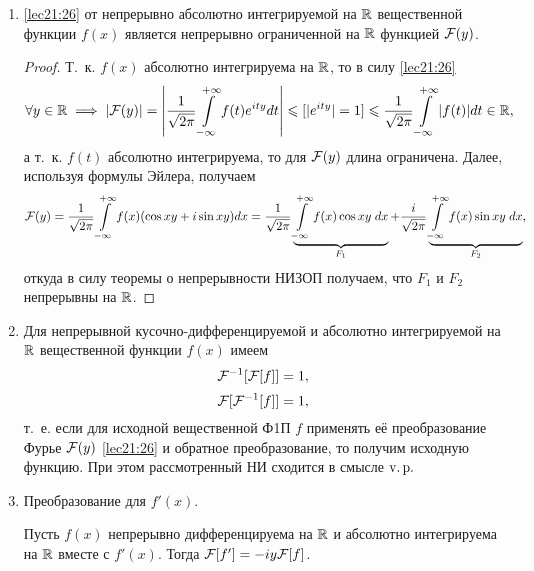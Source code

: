 \documentclass[../../main.tex]{subfiles}
\begin{document}
\begin{enumerate}
  \item \eqref{lec21:26} от непрерывно абсолютно интегрируемой на $\mathbb{R}$ 
  вещественной функции $f(x)$ является непрерывно ограниченной на $\mathbb{R}$ 
  функцией 
  $\mathcal{F}(y)$.
  \begin{proof}
    Т.~к. $f(x)$ абсолютно интегрируема на $\mathbb{R}$, то в силу \eqref{lec21:26}
    \begin{multline*}
      \forall y \in \mathbb{R} \implies |\mathcal{F}(y)| = \left|\frac{1}{\sqrt{2\pi}} \int\limits_{-\infty}^{+\infty} 
      f(t)e^{ity}dt\right| \leqslant [|e^{ity}| = 1] \leqslant \frac{1}{\sqrt{2\pi}} 
      \int\limits_{-\infty}^{+\infty}|f(t)|dt \in \mathbb{R},
    \end{multline*}
    а т.~к. $f(t)$ абсолютно интегрируема, то для $\mathcal{F}(y)$ 
    длина ограничена. Далее, используя формулы Эйлера, получаем
    \begin{multline*}
      \mathcal{F}(y) = \frac{1}{\sqrt{2\pi}} \int\limits_{-\infty}^{+\infty} f(x) (\cos xy + i\sin xy)dx = 
      \frac{1}{\sqrt{2\pi}}
      \underbrace{\int\limits_{-\infty}^{+\infty} f(x) \cos xy\;dx}_{F_1} + \frac{i}{\sqrt{2\pi}} 
      \underbrace{\int\limits_{-\infty}^{+\infty} f(x) \sin xy\;dx}_{F_2},
    \end{multline*}
    откуда в силу теоремы о непрерывности НИЗОП получаем, что $F_1$ и 
    $F_2$ непрерывны на $\mathbb{R}$.
  \end{proof}
  
  \item Для непрерывной кусочно-дифференцируемой и абсолютно интегрируемой 
  на $\mathbb{R}$ вещественной функции $f(x)$ имеем  \[\mathcal{F}^{-1}[\mathcal{F}[f]] = 1,\] 
  \[\mathcal{F}[\mathcal{F}^{-1}[f]] = 1,\] т.~е. если для исходной вещественной Ф1П $f$ 
  применять её преобразование Фурье $\mathcal{F}(y)$ \eqref{lec21:26} и обратное 
  преобразование, то получим исходную функцию. При этом рассмотренный НИ 
  сходится в смысле $\operatorname{v.p.}$
  
  \item Преобразование для $f'(x)$.
  
  Пусть $f(x)$ непрерывно дифференцируема на $\mathbb{R}$ и абсолютно интегрируема 
  на $\mathbb{R}$ вместе с $f'(x)$. Тогда $\mathcal{F}[f'] = -iy\mathcal{F}[f]$.
  

\end{enumerate}
\end{document}
